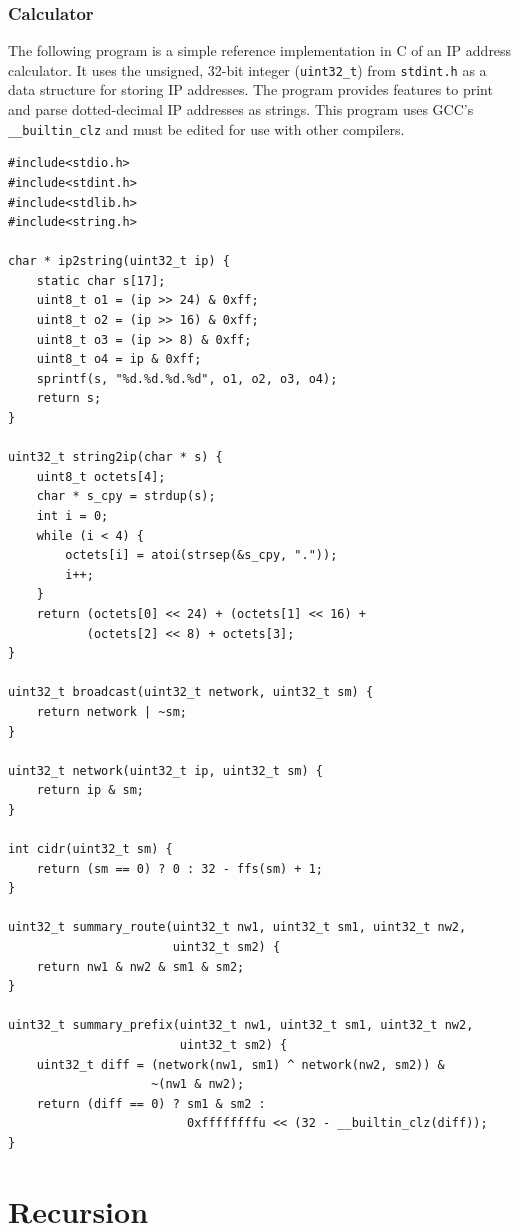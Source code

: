 \documentclass{book}
\begin{document}
\subsection{Calculator}

The following program is a simple reference implementation in C of an IP address calculator. It uses the unsigned, 32-bit integer (\texttt{uint32\_t}) from \texttt{stdint.h} as a data structure for storing IP addresses. The program provides features to print and parse dotted-decimal IP addresses as strings. This program uses GCC's \texttt{\_\_builtin\_clz} and must be edited for use with other compilers.

\begin{lstlisting}
#include<stdio.h>
#include<stdint.h>
#include<stdlib.h>
#include<string.h>

char * ip2string(uint32_t ip) {
    static char s[17];
    uint8_t o1 = (ip >> 24) & 0xff;
    uint8_t o2 = (ip >> 16) & 0xff;
    uint8_t o3 = (ip >> 8) & 0xff;
    uint8_t o4 = ip & 0xff;
    sprintf(s, "%d.%d.%d.%d", o1, o2, o3, o4);
    return s;
}

uint32_t string2ip(char * s) {
    uint8_t octets[4];
    char * s_cpy = strdup(s);
    int i = 0;
    while (i < 4) {
        octets[i] = atoi(strsep(&s_cpy, "."));
        i++;
    }
    return (octets[0] << 24) + (octets[1] << 16) +
    	   (octets[2] << 8) + octets[3];
}

uint32_t broadcast(uint32_t network, uint32_t sm) {
    return network | ~sm;
}

uint32_t network(uint32_t ip, uint32_t sm) {
    return ip & sm;
}

int cidr(uint32_t sm) {
    return (sm == 0) ? 0 : 32 - ffs(sm) + 1;
}

uint32_t summary_route(uint32_t nw1, uint32_t sm1, uint32_t nw2,
                       uint32_t sm2) {
    return nw1 & nw2 & sm1 & sm2;
}

uint32_t summary_prefix(uint32_t nw1, uint32_t sm1, uint32_t nw2,
                        uint32_t sm2) {
    uint32_t diff = (network(nw1, sm1) ^ network(nw2, sm2)) &
        			~(nw1 & nw2);
    return (diff == 0) ? sm1 & sm2 :
                         0xffffffffu << (32 - __builtin_clz(diff));
}
\end{lstlisting}

\chapter{Recursion}
\end{document}
